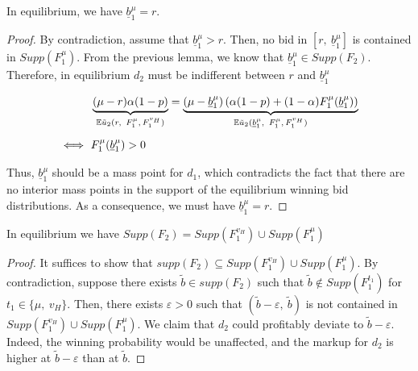 \begin{lem}\label{lem:lowest}
In equilibrium, we have $ \underline{b}_1^{\mu} = r $.
\end{lem}

\begin{proof}
By contradiction, assume that $ \underline{b}_1^{\mu} > r $. Then, no bid in $ \left[r,\ \underline{b}_1^{\mu}\right] $ is contained in $ Supp\left(F_1^{\mu}\right) $. From the previous lemma, we know that $ \underline{b}_1^{\mu} \in Supp(F_2) $. Therefore, in equilibrium $ d_2 $ must be indifferent between $ r $ and $ \underline{b}_1^{\mu} $

\begin{align*}
&\underbrace{(\mu - r)\alpha(1-p)}_\text{$ \mathbb{E}\tilde{u}_2(r,\ F_1^{\mu}, F_1^{v_H})$} = \underbrace{(\mu - \underline{b}_1^{\mu})\left(\alpha(1 - p) + (1 - \alpha) F_1^{\mu}(\underline{b}_1^{\mu}) \right)}_\text{$ \mathbb{E}\tilde{u}_2(\underline{b}_1^{\mu},\ F_1^{\mu}, F_1^{v_H})$}\\[5pt]
\iff \ &F_1^{\mu}(\underline{b}_1^{\mu}) > 0
\end{align*}

\noindent Thus, $ \underline{b}_1^{\mu} $ should be a mass point for $ d_1 $, which contradicts the fact that there are no interior mass points in the support of the equilibrium winning bid distributions. As a consequence, we must have $ \underline{b}_1^{\mu} = r $.
\end{proof}

\begin{lem}\label{lem:union}
In equilibrium we have $ Supp(F_2) = Supp\left(F_1^{v_H}\right) \cup Supp\left(F_1^{\mu}\right) $
\end{lem}

\begin{proof}
It suffices to show that $ supp(F_2) \subseteq Supp\left(F_1^{v_H}\right) \cup Supp\left(F_1^{\mu}\right) $. By contradiction, suppose there exists $ \tilde{b} \in supp(F_2) $ such that $ \tilde{b} \notin Supp\left(F_1^{t_1}\right) $ for $ t_1 \in \{ \mu,\ v_H \} $. Then, there exists $ \varepsilon > 0 $ such that $ (\tilde{b} - \varepsilon,\ \tilde{b}) $ is not contained in $ Supp\left(F_1^{v_H}\right) \cup Supp\left(F_1^{\mu}\right) $. We claim that $ d_2 $ could profitably deviate to $ \tilde{b} - \varepsilon $. Indeed, the winning probability would be unaffected, and the markup for $ d_2 $ is higher at $ \tilde{b} - \varepsilon $ than at $ \tilde{b} $.
\end{proof}

